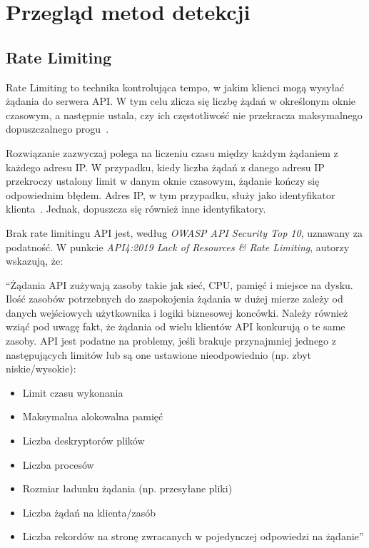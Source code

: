 \newpage


\section{Przegląd metod detekcji}\label{sec:przeglad-rozwiazan}

\subsection{Rate Limiting}\label{subsec:rate-limiting}

Rate Limiting to technika kontrolująca tempo, w jakim klienci mogą wysyłać żądania do serwera API\@.
W tym celu zlicza się liczbę żądań w określonym oknie czasowym, a następnie ustala, czy ich częstotliwość nie przekracza maksymalnego dopuszczalnego progu~\cite{api-rate-limit-adoption}.

Rozwiązanie zazwyczaj polega na liczeniu czasu między każdym żądaniem z każdego adresu IP\@.
W przypadku, kiedy liczba żądań z danego adresu IP przekroczy ustalony limit w danym oknie czasowym, żądanie kończy się odpowiednim błędem.
Adres IP, w tym przypadku, służy jako identyfikator klienta~\cite{cloudflare-what-is-rate-limiting}.
Jednak, dopuszcza się również inne identyfikatory.

Brak rate limitingu API jest, według \emph{OWASP API Security Top 10}, uznawany za podatność.
W punkcie \emph{API4:2019 Lack of Resources \& Rate Limiting}, autorzy wskazują, że:\@
\begin{displayquote}
    ``Żądania API zużywają zasoby takie jak sieć, CPU, pamięć i miejsce na dysku.
    Ilość zasobów potrzebnych do zaspokojenia żądania w dużej mierze zależy od danych wejściowych użytkownika i logiki biznesowej koncówki.
    Należy również wziąć pod uwagę fakt, że żądania od wielu klientów API konkurują o te same zasoby.
    API jest podatne na problemy, jeśli brakuje przynajmniej jednego z następujących limitów lub są one ustawione nieodpowiednio (np. zbyt niskie/wysokie):

    \begin{itemize}
        \item Limit czasu wykonania
        \item Maksymalna alokowalna pamięć
        \item Liczba deskryptorów plików
        \item Liczba procesów
        \item Rozmiar ładunku żądania (np. przesyłane pliki)
        \item Liczba żądań na klienta/zasób
        \item Liczba rekordów na stronę zwracanych w pojedynczej odpowiedzi na żądanie''
    \end{itemize}
\end{displayquote}

